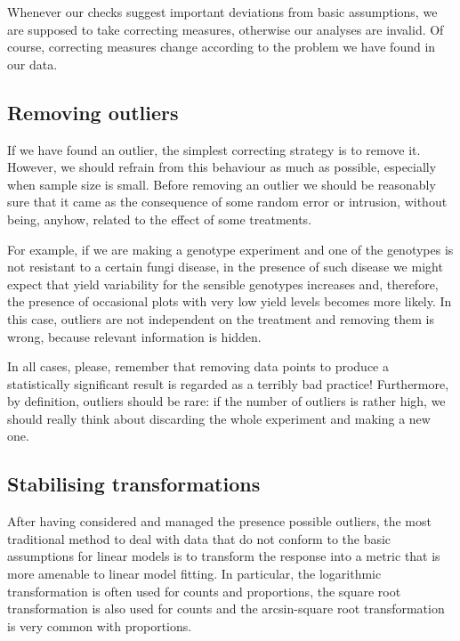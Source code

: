 \documentclass[a4paper,12pt,oneside]{book}
\begin{document}
Whenever our checks suggest important deviations from basic assumptions, we are supposed to take correcting measures, otherwise our analyses are invalid. Of course, correcting measures change according to the problem we have found in our data.

\hypertarget{removing-outliers}{%
\subsection{Removing outliers}\label{removing-outliers}}

If we have found an outlier, the simplest correcting strategy is to remove it. However, we should refrain from this behaviour as much as possible, especially when sample size is small. Before removing an outlier we should be reasonably sure that it came as the consequence of some random error or intrusion, without being, anyhow, related to the effect of some treatments.

For example, if we are making a genotype experiment and one of the genotypes is not resistant to a certain fungi disease, in the presence of such disease we might expect that yield variability for the sensible genotypes increases and, therefore, the presence of occasional plots with very low yield levels becomes more likely. In this case, outliers are not independent on the treatment and removing them is wrong, because relevant information is hidden.

In all cases, please, remember that removing data points to produce a statistically significant result is regarded as a terribly bad practice! Furthermore, by definition, outliers should be rare: if the number of outliers is rather high, we should really think about discarding the whole experiment and making a new one.

\hypertarget{stabilising-transformations}{%
\subsection{Stabilising transformations}\label{stabilising-transformations}}

After having considered and managed the presence possible outliers, the most traditional method to deal with data that do not conform to the basic assumptions for linear models is to transform the response into a metric that is more amenable to linear model fitting. In particular, the logarithmic transformation is often used for counts and proportions, the square root transformation is also used for counts and the arcsin-square root transformation is very common with proportions.
\end{document}
